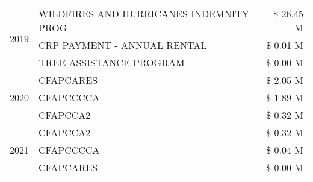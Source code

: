 \begin{tabular}{llr}
\cline{1-3}
\multirow[t]{3}{*}{2019} & WILDFIRES AND HURRICANES INDEMNITY PROG & \$ 26.45 M \\
 & CRP PAYMENT - ANNUAL RENTAL & \$ 0.01 M \\
 & TREE ASSISTANCE PROGRAM & \$ 0.00 M \\
\cline{1-3}
\multirow[t]{3}{*}{2020} & CFAPCARES & \$ 2.05 M \\
 & CFAPCCCCA & \$ 1.89 M \\
 & CFAPCCA2 & \$ 0.32 M \\
\cline{1-3}
\multirow[t]{3}{*}{2021} & CFAPCCA2 & \$ 0.32 M \\
 & CFAPCCCCA & \$ 0.04 M \\
 & CFAPCARES & \$ 0.00 M \\
\cline{1-3}
\bottomrule
\end{tabular}
